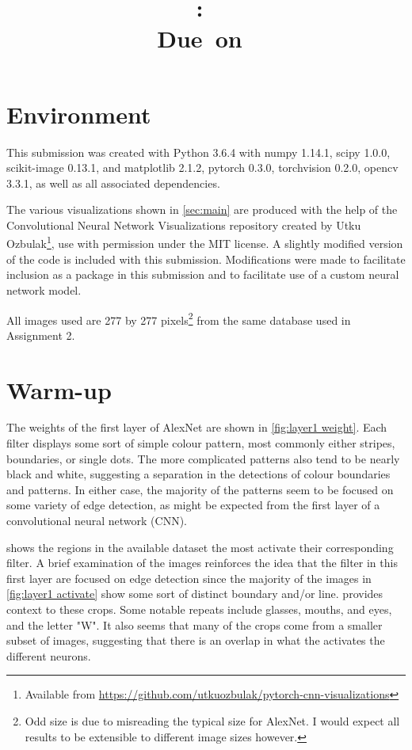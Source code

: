 \documentclass{article}
\title{
	\vspace{2in}
	\textmd{\textbf{\hmwkClass:\ \hmwkTitle}}\\
	\normalsize\vspace{0.1in}\small{Due\ on\ \hmwkDueDate}\\
	\vspace{0.1in}
	\vspace{3in}
}
\author{\textbf{\hmwkAuthorName}}
\begin{document}
\maketitle
\clearpage


\section{Environment}	
This submission was created with Python 3.6.4 with numpy 1.14.1, scipy 1.0.0, scikit-image 0.13.1, and matplotlib 2.1.2, pytorch 0.3.0, torchvision 0.2.0, opencv 3.3.1, as well as all associated dependencies. 

The various visualizations shown in \cref{sec:main} are produced with the help of the Convolutional Neural Network Visualizations repository created by Utku Ozbulak\footnote{Available from \url{https://github.com/utkuozbulak/pytorch-cnn-visualizations}}, use with permission under the MIT license. A slightly modified version of the code is included with this submission. Modifications were made to facilitate inclusion as a package in this submission and to facilitate use of a custom neural network model. 

All images used are 277 by 277 pixels\footnote{Odd size is due to misreading the typical size for AlexNet. I would expect all results to be extensible to different image sizes however.} from the same database used in Assignment 2.
\clearpage

\section{Warm-up}\label{sec:warm up}

The weights of the first layer of AlexNet are shown in \cref{fig:layer1 weight}. Each filter displays some sort of simple colour pattern, most commonly either stripes, boundaries, or single dots. The more complicated patterns also tend to be nearly black and white, suggesting a separation in the detections of colour boundaries and patterns. In either case, the majority of the patterns seem to be focused on some variety of edge detection, as might be expected from the first layer of a convolutional neural network (CNN).

 shows the regions in the available dataset the most activate their corresponding filter. A brief examination of the images reinforces the idea that the filter in this first layer are focused on edge detection since the majority of the images in \cref{fig:layer1 activate} show some sort of distinct boundary and/or line.  provides context to these crops. Some notable repeats include glasses, mouths, and eyes, and the letter "W". It also seems that many of the crops come from a smaller subset of images, suggesting that there is an overlap in what the activates the different neurons.
\end{document}
